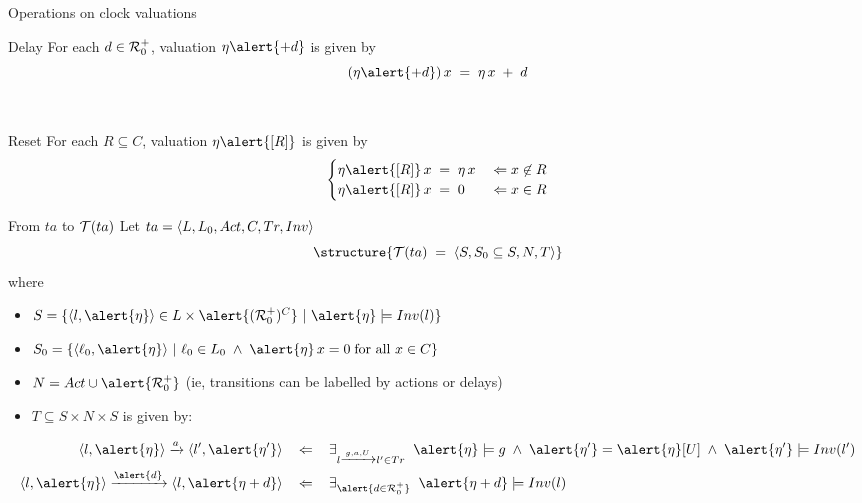 \documentclass[aspectratio=169]{beamer}
\begin{document}
\begin{slide}{Operations on clock valuations}
\small


\begin{block}{Delay}
For each $d \in \mathcal{R}_0^+$, valuation $\eta \alert{+ d}$ is given by
\begin{equation*}
(\eta \alert{+ d})\, x\; =\; \eta\, x\; +\; d
\end{equation*}
\end{block}
~\\

\begin{block}{Reset}
For each $R \subseteq C$, valuation $\eta\alert{[R]}$ is given by
\begin{equation*}
\begin{cases}
\eta\alert{[R]}\, x\; =\; \eta\, x & \; \rimp\; x \not\in R\\
\eta\alert{[R]}\, x\; =\; 0 & \; \rimp\; x \in R
\end{cases}
\end{equation*}
\end{block}
\end{slide}

\begin{slide}{From $ta$ to $\mathcal{T}(ta)$}
\small
Let $ta = \langle L, L_0, Act, C, Tr, Inv \rangle$
\begin{equation*}
 \structure{\TL{ta}\; =\; \pair{S, S_0 \subseteq S, N, T}}
\end{equation*}
where
\begin{itemize}
\item $S = \enset{\pair{l,\alert{\eta}} \in  L \times \alert{(\R_0^+)^C}~|~\alert{\eta} \models Inv(l)}$
\item $S_0 = \enset{\pair{\ell_0,\alert{\eta}}~|~\ell_0 \in L_0\; \land\;  \alert{\eta}\, x = 0\; \text{for all $x \in C$}}$
\item $N = Act \cup \alert{\R_0^+}$ (ie, \alert{transitions can be labelled by actions or delays})
\item $T \subseteq S \times N \times S$ is given by:
\end{itemize}
\begin{align*}
\pair{l,\alert{\eta}} \trans{a} \pair{l',\alert{\eta'}}\; & ~~\rimp~~\; 
\exists_{l \trans{g,a,U} l' \in Tr}  \; \;\alert{\eta} \models g \; \land\; \alert{\eta'} = \alert{\eta}[U] \; \land\;  \alert{\eta'} \models Inv(l')\\
\pair{l,\alert{\eta}} \trans{\alert{d}} \pair{l,\alert{\eta +d}}\; & ~~\rimp~~\; 
\exists_{\alert{d \in \R_0^+}}  \; \;  \alert{\eta + d} \models Inv(l)
\end{align*}
\end{slide}
\end{document}
